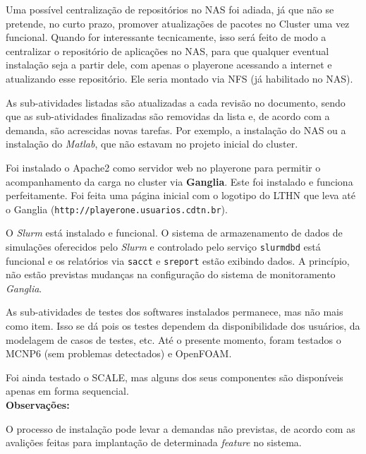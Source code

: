 Uma possível centralização de repositórios no NAS foi adiada, já que não se pretende, no curto prazo, promover atualizações de pacotes no Cluster uma vez 
funcional. Quando for interessante tecnicamente, isso será feito de modo a centralizar o repositório de aplicações no NAS, para que qualquer eventual instalação seja a partir dele, com apenas o playerone acessando a internet e atualizando esse repositório. Ele seria montado via NFS (já habilitado no NAS).

As sub-atividades listadas são atualizadas a cada revisão no documento, sendo que 
as sub-atividades finalizadas são removidas da lista e, de acordo com a demanda, 
são acrescidas novas tarefas. Por exemplo, a instalação do NAS ou a instalação do 
\textit{Matlab}, que não estavam no projeto inicial do cluster.

Foi instalado o Apache2 como servidor web no playerone para permitir o acompanhamento da carga no cluster via \textbf{Ganglia}. Este foi instalado 
e funciona perfeitamente. Foi feita uma página inicial com o logotipo do LTHN 
que leva até o Ganglia (\texttt{http://playerone.usuarios.cdtn.br}).

O \textit{Slurm} está instalado e funcional. O sistema de armazenamento de dados de simulações oferecidos pelo \textit{Slurm} e controlado pelo serviço \texttt{slurmdbd} está funcional e os relatórios via \texttt{sacct} e \texttt{sreport} estão exibindo dados. %
A princípio, não estão previstas mudanças na configuração do sistema de monitoramento \textit{Ganglia}.

As sub-atividades de testes dos softwares instalados permanece, mas não mais como item. Isso se dá pois os testes dependem da disponibilidade dos usuários, da modelagem de casos de testes, etc. Até o presente momento, foram testados o MCNP6 (sem problemas detectados) e OpenFOAM.

Foi ainda testado o SCALE, mas alguns dos seus componentes são disponíveis apenas 
em forma sequencial.\\

\textbf{Observações:}

O processo de instalação pode levar a demandas não previstas, de acordo com as avalições feitas para implantação de determinada \textit{feature} no sistema.


